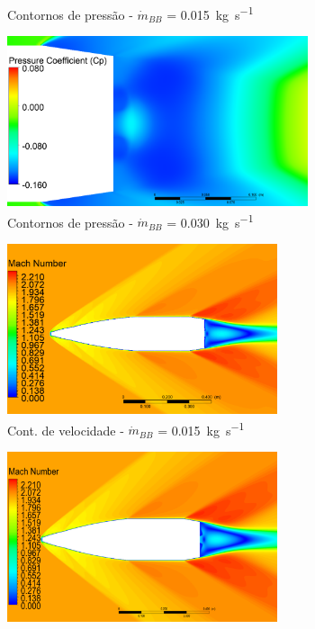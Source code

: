 \begin{figure}[!ht]
\begin{subfigure}[b]{0.47\textwidth}
        \caption{Contornos de pressão - \(\Dot{m}_{BB}\) = \qty{0,015}{\kilogram\per\second}}
        \label{fig:contorno-pressao-base-bb-1pol-vazao0015}
    \end{subfigure}
    \hfill
    \begin{subfigure}[b]{0.47\textwidth} %
        \centering
        \includegraphics[height=5cm,width=\textwidth]{coeficientepressao-vazao0030-temp2306-diam1pol.png}
        \caption{Contornos de pressão - \(\Dot{m}_{BB}\) = \qty{0,030}{\kilogram\per\second}}
        \label{fig:contorno-pressao-base-bb-1pol-vazao0030}
    \end{subfigure}
    \hfill
    \begin{subfigure}[b]{0.47\textwidth} %
        \centering
        \includegraphics[height=5cm,width=\textwidth]{contorno-velocidade-2306K-vazao-0015-1pol.png}
        \caption{Cont. de velocidade - \(\Dot{m}_{BB}\) = \qty{0,015}{\kilogram\per\second}}
        \label{fig:contorno-velocidade-bb-1pol-vazao0015}
    \end{subfigure}
    \hfill
	\begin{subfigure}[b]{0.47\textwidth} %
        \centering
        \includegraphics[height=5cm,width=\textwidth]{contorno-velocidade-2306K-vazao-0030-1pol.png}

\end{subfigure}
\end{figure}
